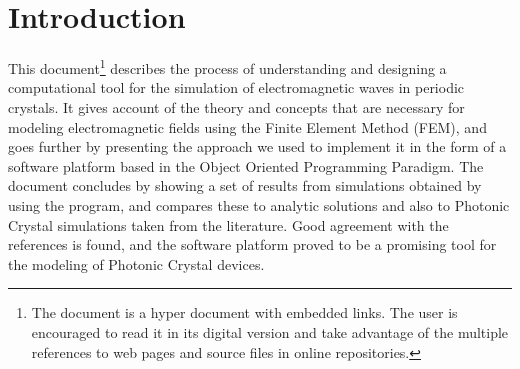 \cleardoublepage {}
{}
\chapter*{Introduction}

This document\footnote{The document is a hyper document with embedded links. The user is encouraged to read it in its digital version and take advantage of the multiple references to web pages and source files in online repositories.} describes the process of understanding and designing a computational tool for the simulation of electromagnetic waves in periodic crystals. It gives account of the  theory and concepts that are necessary for modeling electromagnetic fields using the Finite Element Method (FEM), and goes further by presenting the approach we used to implement it in the form of a software platform based in the Object Oriented Programming Paradigm. The document concludes by showing a set of results from simulations obtained by using the program, and compares these to analytic solutions and also to Photonic Crystal simulations taken from the literature. Good agreement with the references is found, and the software platform proved to be a promising tool for the modeling of Photonic Crystal devices.


